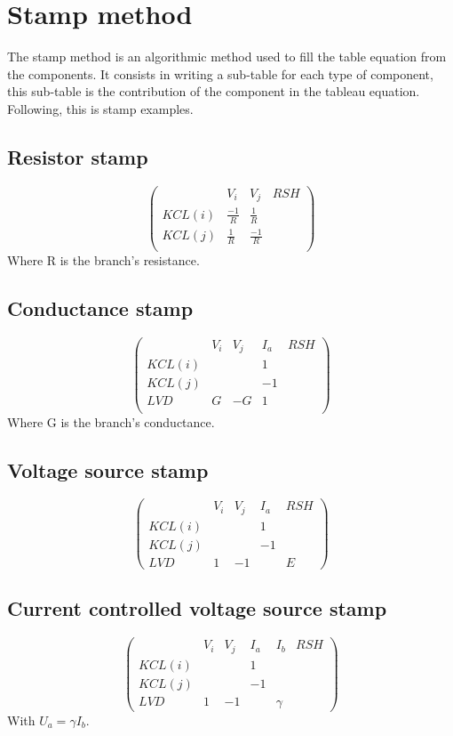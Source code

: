 \documentclass[10pt]{article}
\begin{document}
\section{Stamp method}
The stamp method is an algorithmic method used to fill the table equation from the components. It
consists in writing a sub-table for each type of component, this sub-table is the contribution of the component in the tableau equation.\\
Following, this is stamp examples.
\subsection{Resistor stamp}
\[\left(\begin{array}{cccc}
&V_{i}&V_{j}&RSH\\
  \hline
  KCL(i)&\frac{-1}{R}&\frac{1}{R}&\\
  KCL(j)&\frac{1}{R}&\frac{-1}{R}&\\
  \end{array}\right)
\]
Where R is the branch's resistance.
\subsection{Conductance stamp}
\[\left(\begin{array}{ccccc}
&V_{i}&V_{j}&I_{a}&RSH\\
  \hline
  KCL(i)&&&1&\\
  KCL(j)&&&-1&\\
  LVD&G&-G&1&\\
  \end{array}\right)
\]
Where G is the branch's conductance.
\subsection{Voltage source stamp}
\[\left(\begin{array}{ccccc}
&V_{i}&V_{j}&I_{a}&RSH\\
  \hline
  KCL(i)&&&1\\
  KCL(j)&&&-1\\
  LVD&1&-1&&E
  \end{array}\right)
\]
\subsection{Current controlled voltage source stamp}
\[\left(\begin{array}{cccccc}
&V_{i}&V_{j}&I_{a}&I_{b}&RSH\\
  \hline
  KCL(i)&&&1&\\
  KCL(j)&&&-1&\\
  LVD&1&-1&&\gamma
  \end{array}\right)
\]
With $U_{a} = \gamma I_{b}$.

 
\end{document}
